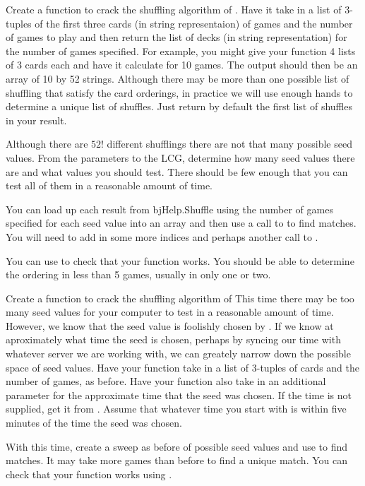 \begin{problem}
Create a function to crack the shuffling algorithm of . 
Have it take in a list of 3-tuples of the first three cards (in string representaion) of games and the number of games to play and then return the list of decks (in string representation) for the number of games specified. 
For example, you might give your function 4 lists of 3 cards each and have it calculate for 10 games. 
The output should then be an array of 10 by 52 strings. 
Although there may be more than one possible list of shuffling that satisfy the card orderings, in practice we will use enough hands to determine a unique list of shuffles. Just return by default the first list of shuffles in your result.

Although there are $52!$ different shufflings there are not that many possible seed values. 
From the parameters to the LCG, determine how many seed values there are and what values you should test.
There should be few enough that you can test all of them in a reasonable amount of time.

You can load up each result from bjHelp.Shuffle using the number of games specified for each seed value into an array and then use a call to  to find matches.
You will need to add in some more indices and perhaps another call to .

You can use  to check that your function works. You should be able to determine the ordering in less than 5 games, usually in only one or two.
\end{problem}

\begin{problem}
Create a function to crack the shuffling algorithm of 
This time there may be too many seed values for your computer to test in a reasonable amount of time. 
However, we know that the seed value is foolishly chosen by .
If we know at aproximately what time the seed is chosen, perhaps by syncing our time with whatever server we are working with, we can greately narrow down the possible space of seed values.
Have your function take in a list of 3-tuples of cards and the number of games, as before.
Have your function also take in an additional parameter for the approximate time that the seed was chosen.
If the time is not supplied, get it from .
Assume that whatever time you start with is within five minutes of the time the seed was chosen.

With this time, create a sweep as before of possible seed values and use  to find matches.
It may take more games than before to find a unique match.
You can check that your function works using .
\end{problem}
